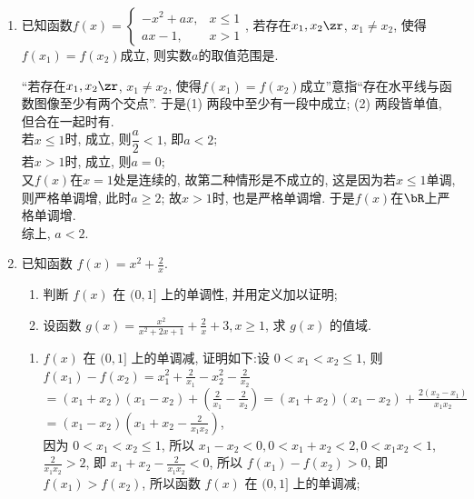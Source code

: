 \begin{enumerate}
\item 已知函数$f(x)=\begin{cases}
-x^2+ax, & x\leq 1\\
ax-1, & x>1
\end{cases}$, 
若存在$x_1,x_2\zr$, $x_1\neq x_2$, 使得$f(x_1)=f(x_2)$成立, 则实数$a$的取值范围是. 
\begin{jieda}
``若存在$x_1,x_2\zr$, $x_1\neq x_2$, 使得$f(x_1)=f(x_2)$成立''意指``存在水平线与函数图像至少有两个交点''. 
于是(1) 两段中至少有一段中成立; (2) 两段皆单值, 但合在一起时有. \\
若$x\leq 1$时, 成立, 则$\dfrac{a}{2}<1$, 即$a<2$; \\
若$x>1$时, 成立, 则$a=0$; \\
又$f(x)$在$x=1$处是连续的, 故第二种情形是不成立的, 这是因为若$x\leq 1$单调, 则严格单调增, 此时$a\geq 2$; 故$x>1$时, 也是严格单调增. 于是$f(x)$在$\bR$上严格单调增. \\
综上, $a<2$. 
\end{jieda}


\item 已知函数 $f(x)=x^{2}+\frac{2}{x}$.
\begin{enumerate}
    \item 判断 $f(x)$ 在 $(0,1]$ 上的单调性, 并用定义加以证明;
    \item 设函数 $g(x)=\frac{x^{2}}{x^{2}+2 x+1}+\frac{2}{x}+3, x \geq 1$, 求 $g(x)$ 的值域.
\end{enumerate}
\begin{jieda}
\begin{enumerate}
    \item $f(x)$ 在 $(0,1]$ 上的单调减, 证明如下:设 $0<x_{1}<x_{2} \leq 1$, 则 $f\left(x_{1}\right)-f\left(x_{2}\right)=x_{1}^{2}+\frac{2}{x_{1}}-x_{2}^{2}-\frac{2}{x_{2}}$
    $=\left(x_{1}+x_{2}\right)\left(x_{1}-x_{2}\right)+\left(\frac{2}{x_{1}}-\frac{2}{x_{2}}\right)=\left(x_{1}+x_{2}\right)\left(x_{1}-x_{2}\right)+\frac{2\left(x_{2}-x_{1}\right)}{x_{1} x_{2}}$
    $=\left(x_{1}-x_{2}\right)\left(x_{1}+x_{2}-\frac{2}{x_{1} x_{2}}\right)$,\\
    因为 $0<x_{1}<x_{2} \leq 1$, 所以 $x_{1}-x_{2}<0,0<x_{1}+x_{2}<2,0<x_{1} x_{2}<1$,
    $\frac{2}{x_{1} x_{2}}>2$, 即 $x_{1}+x_{2}-\frac{2}{x_{1} x_{2}}<0$,
    所以 $f\left(x_{1}\right)-f\left(x_{2}\right)>0$, 即 $f\left(x_{1}\right)>f\left(x_{2}\right)$,
    所以函数 $f(x)$ 在 $(0,1]$ 上的单调减;
    

\end{enumerate}
\end{jieda}
\end{enumerate}
